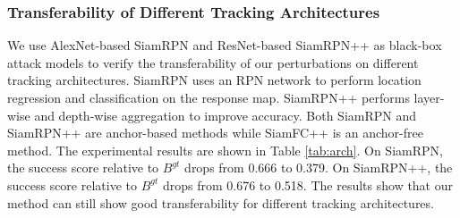 \documentclass{article}
\begin{document}
\begin{table}[ht]
\begin{center}
\end{center}
\caption{Transferability of different backbones on GOT-10k\_Val.}
\label{tab:backbone}
\end{table}

\subsubsection{Transferability of Different Tracking Architectures}

We use AlexNet-based SiamRPN \cite{SiamRPN} and ResNet-based SiamRPN++ \cite{SiamRPN++} as black-box attack models to verify the transferability of our perturbations on different tracking architectures.
SiamRPN uses an RPN network to perform location regression and classification on the response map. SiamRPN++ performs layer-wise and depth-wise aggregation to improve accuracy. Both SiamRPN and SiamRPN++ are anchor-based methods while SiamFC++ is an anchor-free method.
The experimental results are shown in Table \ref{tab:arch}. On SiamRPN, the success score relative to $B^{gt}$ drops from 0.666 to 0.379. On SiamRPN++, the success score relative to $B^{gt}$ drops from 0.676 to 0.518. The results show that our method can still show good transferability for different tracking architectures.
\end{document}
